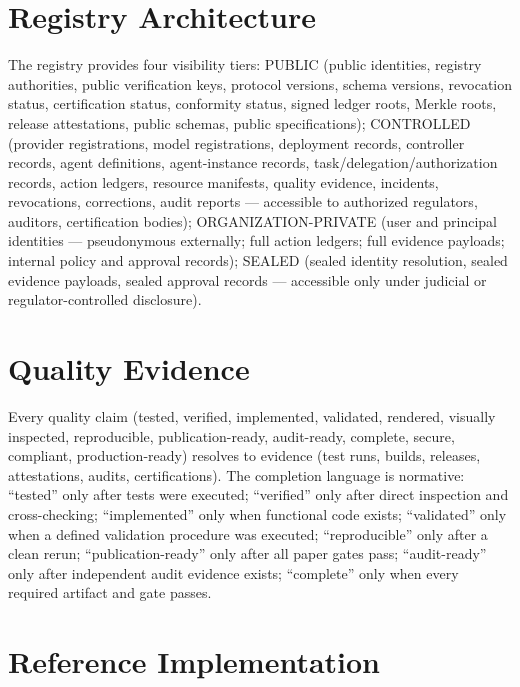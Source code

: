 \documentclass[11pt,a4paper]{article}
\begin{document}
\section{Registry Architecture}
\label{sec:registry-architecture}

The registry provides four visibility tiers: PUBLIC (public identities, registry authorities, public verification keys, protocol versions, schema versions, revocation status, certification status, conformity status, signed ledger roots, Merkle roots, release attestations, public schemas, public specifications); CONTROLLED (provider registrations, model registrations, deployment records, controller records, agent definitions, agent-instance records, task/delegation/authorization records, action ledgers, resource manifests, quality evidence, incidents, revocations, corrections, audit reports --- accessible to authorized regulators, auditors, certification bodies); ORGANIZATION-PRIVATE (user and principal identities --- pseudonymous externally; full action ledgers; full evidence payloads; internal policy and approval records); SEALED (sealed identity resolution, sealed evidence payloads, sealed approval records --- accessible only under judicial or regulator-controlled disclosure).

\section{Quality Evidence}
\label{sec:quality-evidence}

Every quality claim (tested, verified, implemented, validated, rendered, visually inspected, reproducible, publication-ready, audit-ready, complete, secure, compliant, production-ready) resolves to evidence (test runs, builds, releases, attestations, audits, certifications). The completion language is normative: ``tested'' only after tests were executed; ``verified'' only after direct inspection and cross-checking; ``implemented'' only when functional code exists; ``validated'' only when a defined validation procedure was executed; ``reproducible'' only after a clean rerun; ``publication-ready'' only after all paper gates pass; ``audit-ready'' only after independent audit evidence exists; ``complete'' only when every required artifact and gate passes.

\section{Reference Implementation}
\label{sec:implementation}
\end{document}
